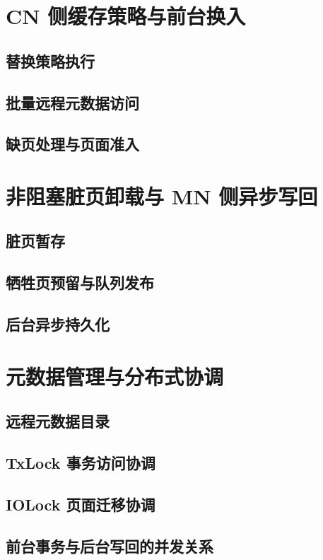 \section{CN 侧缓存策略与前台换入}
\subsection{替换策略执行}
\subsection{批量远程元数据访问}
\subsection{缺页处理与页面准入}

\section{非阻塞脏页卸载与 MN 侧异步写回}
\subsection{脏页暂存}
\subsection{牺牲页预留与队列发布}
\subsection{后台异步持久化}

\section{元数据管理与分布式协调}
\subsection{远程元数据目录}
\subsection{TxLock 事务访问协调}
\subsection{IOLock 页面迁移协调}
\subsection{前台事务与后台写回的并发关系}


